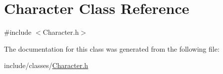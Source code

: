 \hypertarget{classCharacter}{}\section{Character Class Reference}
\label{classCharacter}


{\ttfamily \#include $<$Character.\+h$>$}



The documentation for this class was generated from the following file\+:\begin{DoxyCompactItemize}
\item 
include/classes/\hyperlink{Character_8h}{Character.\+h}\end{DoxyCompactItemize}
